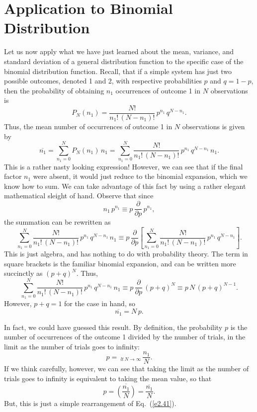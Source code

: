 \section{Application to  Binomial Distribution}
Let us now apply what we have just learned about  the mean, variance, and
standard deviation of a general distribution function
 to the specific case of the 
binomial distribution function. Recall,
that if a simple system has just two possible outcomes, 
denoted 1 and 2, with 
respective probabilities $p$ and $q=1-p$, 
then the probability of obtaining $n_1$ 
occurrences of outcome 1 in $N$ observations is
\begin{equation}
P_N(n_1) = \frac{N!}{n_1!\,(N-n_1)!}\,p^{n_1}\,q^{N-n_1}.
\end{equation}
Thus, the mean number of occurrences of outcome 1 in $N$ observations
is given by
\begin{equation}
\overline{n_1} = \sum_{n_1=0}^N P_N(n_1)\,n_1 = \sum_{n_1=0}^N
\frac{N!}{n_1!\,(N-n_1)!}\,p^{n_1}\,q^{N-n_1}\, n_1.
\end{equation}
This is a rather nasty looking expression! However, we can see that if the
final factor 
$n_1$ were absent, it  would just reduce to the binomial expansion, which we 
know how to sum. We can take advantage of this fact by using a rather elegant
mathematical sleight of hand. Observe that since
\begin{equation}
n_1\,p^{n_1} \equiv p\,\frac{\partial}{\partial p}\,p^{n_1},
\end{equation}
the summation can be rewritten as
\begin{equation}
\sum_{n_1=0}^N\frac{N!}{n_1!\,(N-n_1)!}\,p^{n_1}\,q^{N-n_1}\, n_1
\equiv p\,
\frac{\partial}{\partial p}\!\left[\sum_{n_1=0}^N
\frac{N!}{n_1!\,(N-n_1)!}\,p^{n_1}\,q^{N-n_1}
\right].
\end{equation}
This is just algebra, and has nothing to do with probability theory.
The term in square brackets is the familiar binomial expansion, and 
can be written more succinctly as $(p+q)^N$.
Thus, 
\begin{equation}
\sum_{n_1=0}^N\frac{N!}{n_1!\,(N-n_1)!}\,p^{n_1}\,q^{N-n_1}\, n_1
\equiv p\,\frac{\partial}{\partial p} \,(p+q)^N\equiv p\,N\,(p+q)^{N-1}.
\end{equation}
However, $p+q=1$ for the case in hand, so
\begin{equation}
\overline{n_1} = N\,p.\label{e2.41}
\end{equation}

In fact, we could  have guessed this result. 
By definition, the probability $p$ is the number of occurrences of the
outcome 1 divided by the number of trials, in the limit as the number
of trials goes to infinity:
\begin{equation}
p= ~_{lt\,N\rightarrow\infty~}\frac{n_1}{N}.
\end{equation}
If we think carefully, however,
 we can see  that taking the limit as the number
of trials goes to infinity is equivalent to taking the mean value,
so that
\begin{equation}
p = \overline{\left(\frac{n_1}{N}\right)} = \frac{\overline{n_1}}{N}.
\end{equation}
But, this is just a simple rearrangement of Eq.~(\ref{e2.41}).


